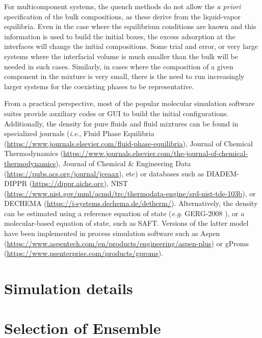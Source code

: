 \documentclass[9pt,bestpractices]{livecoms}
\begin{document}
For multicomponent systems, the quench methods do not allow the \textit{a
priori} specification of the bulk compositions, as these derive from the
liquid-vapor equilibria. Even in the case where the equilibrium conditions are
known and this information is used to build the initial boxes, the excess
adsorption at the interfaces will change the initial compositions. Some trial
and error, or very large systems where the interfacial volume is much smaller
than the bulk will be needed in such cases. Similarly, in cases where the
composition of a given component in the mixture is very small, there is the
need to run increasingly larger systems for the coexisting phases to be
representative.

From a practical perspective, most of the popular molecular simulation software
suites provide auxiliary codes or GUI to build the initial configurations.
Additionally, the density for pure fluids and fluid mixtures can be found in
specialized journals (\textit{i.e}., Fluid Phase Equilibria (\url{https://www.journals.elsevier.com/fluid-phase-equilibria}),
Journal of Chemical Thermodynamics (\url{https://www.journals.elsevier.com/the-journal-of-chemical-thermodynamics}),
Journal of Chemical \& Engineering Data (\url{https://pubs.acs.org/journal/jceaax}),
etc)
or databases such as DIADEM-DIPPR (\url{https://dippr.aiche.org}),
NIST \citep{lemmon2013} (\url{https://www.nist.gov/mml/acmd/trc/thermodata-engine/srd-nist-tde-103b}),
or DECHEMA (\url{https://i-systems.dechema.de/detherm/}).
Alternatively, the density can be estimated using a reference equation of state
(\textit{e.g}. GERG-2008 \citep{kunz2012}),
or a molecular-based equation of
state, such as SAFT\citep{lafitte2013}.
Versions of the latter model have been implemented in process simulation
software such as Aspen (\url{https://www.aspentech.com/en/products/engineering/aspen-plus})
or gProms (\url{https://www.psenterprise.com/products/gproms}).

\section{Simulation details}

\section{Selection of Ensemble}
\end{document}
